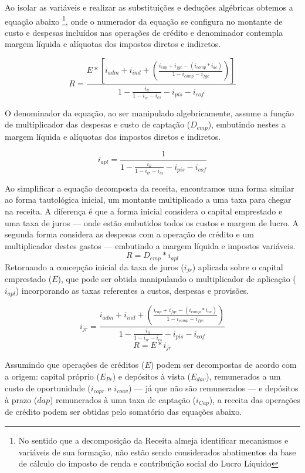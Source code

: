 \documentclass[12pt,12pt,openright,oneside,a4paper,chapter=TITLE,section=TITLE,subsection=TITLE,subsubsection=TITLE,english,french,spanish,portugues,sumario=tradicional]{abntex2}
\begin{document}
Ao isolar as variáveis e realizar as substituições e deduções algébricas obtemos a equação abaixo \footnote{No sentido que a decomposição da Receita almeja identificar mecanismos e variáveis de sua formação, não estão sendo considerados abatimentos da base de cálculo do imposto de renda e contribuição social do Lucro Líquido}, onde o numerador da equação se configura no montante de custo e despesas incluídos nas operações de crédito e denominador contempla margem líquida e alíquotas dos impostos diretos e indiretos.

\[
R =  \frac{E * [i_{adm} + i_{ind} + (\frac{i_{cap}+ i_{fgc} - (i_{comp}*i_{ac})}{1 - i_{comp} - i_{fgc}})]}
{1 -  \frac{i_{ll}}{1 - i_{ir}  - i_{cs}} - i_{pis} - i_{cof}}
\]

O denominador da equação, ao ser manipulado algebricamente, assume a função de multiplicador das despesas e custo de captação (\(D_{emp}\)), embutindo nestes a margem líquida e alíquotas dos impostos diretos e indiretos.

\[
i_{apl} = \frac{1}{1 -  \frac{i_{ll}}{1 - i_{ir}  - i_{cs}} - i_{pis} - i_{cof}}
\]

Ao simplificar a equação decomposta da receita, encontramos uma forma similar ao forma tautológica inicial, um montante multiplicado a uma taxa para chegar na receita. A diferença é que a forma inicial considera o capital emprestado e uma taxa de juros --- onde estão embutidos todos os custos e margem de lucro. A segunda forma considera as despesas com a operação de crédito e um multiplicador destes gastos --- embutindo a margem líquida e impostos variáveis.
\[
R = D_{emp} * i_{apl} 
\]
Retornando a concepção inicial da taxa de juros (\(i_{jr}\)) aplicada sobre o capital emprestado (\(E\)), que pode ser obtida manipulando o multiplicador de aplicação (\(i_{apl}\)) incorporando as taxas referentes a custos, despesas e provisões.

\[
i_{jr} = \frac{i_{adm} + i_{ind} + (\frac{i_{cap}+ i_{fgc} - (i_{comp}*i_{ac})}{1 - i_{comp} - i_{fgc}})}{1 -  \frac{i_{ll}}{1 - i_{ir}  - i_{cs}} - i_{pis} - i_{cof}}
\]
\[
R = E * i_{jr} 
\]

Assumindo que operações de créditos (\(E\)) podem ser decompostas de acordo com a origem: capital próprio (\(E_{Pr}\)) e depósitos à vista (\(E_{dav}\)), remunerados a um custo de oportunidade (\(i_{copr}\) e \(i_{coav}\)) --- já que não são remunerados --- e depósitos à prazo (\(dap\)) remunerados à uma taxa de captação (\(i_{Cap}\)), a receita das operações de crédito podem ser obtidas pelo somatório das equações abaixo.
\end{document}
